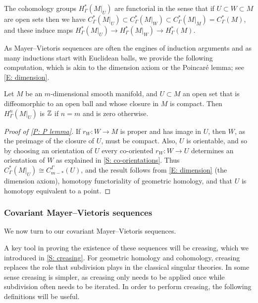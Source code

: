 The cohomology groups $H_\Gamma^*(M|_U)$ are functorial in the sense that if $U \subset W \subset M$ are open sets then we have $C_\Gamma^*(M|_U) \subset C_\Gamma^*(M|_W) \subset C_\Gamma^*(M|_M) = C_\Gamma^*(M)$, and these induce maps $H_\Gamma^*(M|_U) \to H_\Gamma^*(M|_W) \to H_\Gamma^*(M)$.


As Mayer--Vietoris sequences are often the engines of induction arguments and as many inductions start with Euclidean balls, we provide the following computation, which is akin to the dimension axiom or the Poincar\'e lemma; see \cref{E: dimension}.

\begin{proposition}\label{P: P lemma}
	Let $M$ be an $m$-dimensional smooth manifold, and $U \subset M$ an open set that is diffeomorphic to an open ball and whose closure in $M$ is compact.
	Then $H^n_\Gamma(M|_U)$ is $\mathbb{Z}$ if $n = m$ and is zero otherwise.
\end{proposition}


\begin{proof}[Proof of \cref{P: P lemma}]
	If $r_W \colon W \to M$ is proper and has image in $U$, then $W$, as the preimage of the closure of $U$, must be compact.
	Also, $U$ is orientable, and so by choosing an orientation of $U$ every co-oriented $r_W \colon W \to U$ determines an orientation of $W$ as explained in \cref{S: co-orientations}.
	Thus $C^*_\Gamma(M|_U) \cong C_{m-*}^\Gamma(U)$, and the result follows from \cref{E: dimension} (the dimension axiom), homotopy functoriality of geometric homology, and that $U$ is homotopy equivalent to a point.
\end{proof}



\subsubsection{Covariant Mayer--Vietoris sequences}

We now turn to our covariant Mayer--Vietoris sequences.


A key tool in proving the existence of these sequences will be creasing, which we introduced in \cref{S: creasing}.
For geometric homology and cohomology, creasing replaces the role that subdivision plays in the classical singular theories.
In some sense creasing is simpler, as creasing only needs to be applied once while subdivision often needs to be iterated.
In order to perform creasing, the following definitions will be useful.

